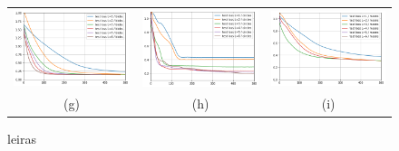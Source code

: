 \documentclass[12pt, a4paper,  nobibnotes]{article}
\begin{document}
\begin{figure}[H]
\begin{tabular}{ccc}
      \includegraphics[width=\thisfigurewidth\textwidth]{figures/test_loss_blobs_lr=0_001.png} & 
      \includegraphics[width=\thisfigurewidth\textwidth]{figures/test_loss_circles_lr=0_1.png} &
      \includegraphics[width=\thisfigurewidth\textwidth]{figures/test_loss_moons_lr=0_001.png} \\
      (g) & (h) & (i) \\[6.5pt]
    \end{tabular}
    \caption{leiras}
    \label{fig:classification_results}
\end{figure}
\end{document}
